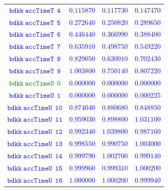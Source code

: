\documentclass[10pt,a4paper]{article}
\begin{document}
\begin{table}[h!]
{\begin{tabular}{cccc}
\textcolor{blue}{$\mathtt{bdkk~accTimeT~~4}$} & \textcolor{blue}{$0.115870$}& \textcolor{blue}{$0.117730$}& \textcolor{blue}{$0.147470$}\\
\textcolor{blue}{$\mathtt{bdkk~accTimeT~~5}$} & \textcolor{blue}{$0.272640$}& \textcolor{blue}{$0.250820$}& \textcolor{blue}{$0.289650$}\\
\textcolor{blue}{$\mathtt{bdkk~accTimeT~~6}$} & \textcolor{blue}{$0.446440$}& \textcolor{blue}{$0.366990$}& \textcolor{blue}{$0.388400$}\\
\textcolor{blue}{$\mathtt{bdkk~accTimeT~~7}$} & \textcolor{blue}{$0.635910$}& \textcolor{blue}{$0.498750$}& \textcolor{blue}{$0.549220$}\\
\textcolor{blue}{$\mathtt{bdkk~accTimeT~~8}$} & \textcolor{blue}{$0.829050$}& \textcolor{blue}{$0.630910$}& \textcolor{blue}{$0.702430$}\\
\textcolor{blue}{$\mathtt{bdkk~accTimeT~~9}$} & \textcolor{blue}{$1.003800$}& \textcolor{blue}{$0.750140$}& \textcolor{blue}{$0.807220$}\\
\textcolor{Green}{$\mathtt{bdkk~accTimeU~~0}$} & \textcolor{blue}{$0.000000$}& \textcolor{blue}{$0.000000$}& \textcolor{blue}{$0.000000$}\\
\textcolor{blue}{$\mathtt{bdkk~accTimeU~~1}$} & \textcolor{blue}{$0.000000$}& \textcolor{blue}{$0.000000$}& \textcolor{blue}{$0.000225$}\\
\textcolor{blue}{$\mathtt{bdkk~accTimeU~~10}$} & \textcolor{blue}{$0.874040$}& \textcolor{blue}{$0.880680$}& \textcolor{blue}{$0.848850$}\\
\textcolor{blue}{$\mathtt{bdkk~accTimeU~~11}$} & \textcolor{blue}{$0.959030$}& \textcolor{blue}{$0.898800$}& \textcolor{blue}{$1.031100$}\\
\textcolor{blue}{$\mathtt{bdkk~accTimeU~~12}$} & \textcolor{blue}{$0.992340$}& \textcolor{blue}{$1.039800$}& \textcolor{blue}{$0.987160$}\\
\textcolor{blue}{$\mathtt{bdkk~accTimeU~~13}$} & \textcolor{blue}{$0.998550$}& \textcolor{blue}{$0.990750$}& \textcolor{blue}{$1.003000$}\\
\textcolor{blue}{$\mathtt{bdkk~accTimeU~~14}$} & \textcolor{blue}{$0.999790$}& \textcolor{blue}{$1.002700$}& \textcolor{blue}{$0.999140$}\\
\textcolor{blue}{$\mathtt{bdkk~accTimeU~~15}$} & \textcolor{blue}{$0.999960$}& \textcolor{blue}{$0.999310$}& \textcolor{blue}{$1.000200$}\\
\textcolor{blue}{$\mathtt{bdkk~accTimeU~~16}$} & \textcolor{blue}{$1.000000$}& \textcolor{blue}{$1.000200$}& \textcolor{blue}{$0.999940$}\\

\end{tabular}}
\end{table}
\end{document}
